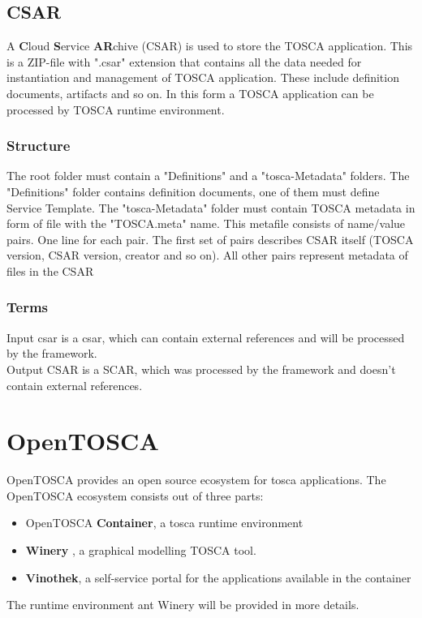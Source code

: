 \subsection{CSAR} \label{sec:csar}
A \textbf{C}loud \textbf{S}ervice \textbf{AR}chive (CSAR) is used to store the TOSCA application.
This is a ZIP-file with ".csar" extension that contains all the data needed for instantiation and management of TOSCA application.
These include definition documents, artifacts and so on.
In this form a TOSCA application can be processed by TOSCA runtime environment.
\subsubsection*{Structure}
The root folder must contain a "Definitions" and a "\gls{tosca}-Metadata" folders.
The "Definitions" folder contains definition documents, one of them must define Service Template.
The "\gls{tosca}-Metadata" folder must contain TOSCA metadata in form of file with the "TOSCA.meta" name.
This metafile consists of name/value pairs. 
One line for each pair. 
The first set of pairs describes CSAR itself (TOSCA version, CSAR version, creator and so on). 
All other pairs represent metadata of files in the CSAR

\subsubsection*{Terms}
Input \gls{csar} is a \gls{csar}, which can contain external references and will be processed by the framework.\\
Output CSAR is a SCAR, which was processed by the framework and doesn't contain external references.

\section{OpenTOSCA} \label{sec:opentosca}
OpenTOSCA provides an open source ecosystem for \gls{tosca} applications. 
The OpenTOSCA ecosystem consists out of three parts: \cite*{OpenTOSCA}
\begin{itemize}
	\item OpenTOSCA \textbf{Container}, a \gls{tosca} runtime environment
	\item \textbf{Winery} \label{tool:winery}, a graphical modelling TOSCA tool.
	\item \textbf{Vinothek}, a self-service portal for the applications available in the container
\end{itemize}
The runtime environment ant Winery will be provided in more details. 
